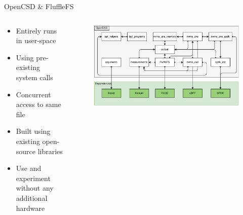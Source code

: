 \documentclass[aspectratio=169]{beamer}
\begin{document}
\begin{frame}{OpenCSD \& FluffleFS}
    \begin{columns}
        \begin{column}{0.45\textwidth}
            \footnotesize
            \begin{itemize}
                \item Entirely runs in user-space
                \item Using pre-existing system calls
                \item Concurrent access to same file
                \item Built using existing open-source libraries
                \item Use and experiment without any additional hardware
            \end{itemize}
        \end{column}
        \begin{column}{0.55\textwidth}
            \begin{figure}
                \centering
                \includegraphics[width=1\textwidth]{resources/images/module-dependencies.pdf}
            \end{figure}
        \end{column}
    \end{columns}
\end{frame}
\end{document}
